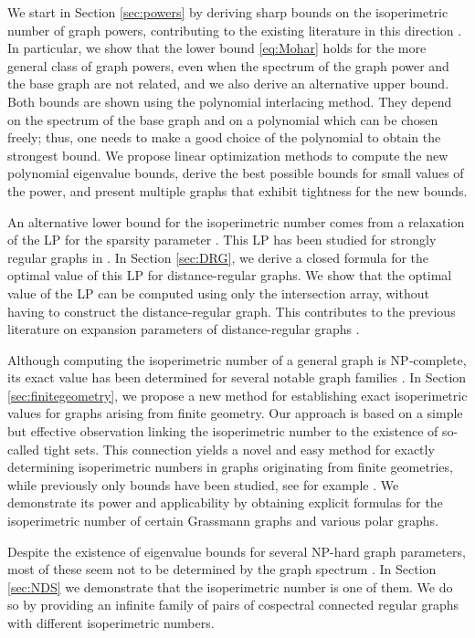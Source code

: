 \documentclass[a4paper,11pt]{article}
\theoremstyle{definition}
\begin{document}
We start in Section \ref{sec:powers} by deriving sharp bounds on the isoperimetric number of graph powers, contributing to the existing literature in this direction  \cite{cartesianpowersregulargrpahs,hypercubeedgeisopowers,V2026}. In particular, we show that the lower bound \eqref{eq:Mohar} holds for the more general class of graph  powers, even when the spectrum of the graph power and the base graph are not related, and we also derive an alternative upper bound. Both bounds are shown using the polynomial interlacing method. They depend on the spectrum of the base graph and on a polynomial which can be chosen freely; thus, one needs to make a good choice of the polynomial to obtain the strongest bound. We propose linear optimization methods to compute the new polynomial eigenvalue bounds, derive the best possible bounds for small values of the power, and present multiple graphs that exhibit tightness for the new bounds.

An alternative lower bound for the isoperimetric number comes from a relaxation of the LP for the sparsity parameter \cite{LLR1995}. This LP has been studied for strongly regular graphs in \cite{S2005}. In Section \ref{sec:DRG}, we derive a closed formula for the optimal value of this LP for distance-regular graphs. We show that the optimal value of the LP can be computed using only the intersection array, without having to construct the distance-regular graph. This contributes to the previous literature on expansion parameters of distance-regular graphs  \cite{KL2013,QKM2020,S2005}. 

Although computing the isoperimetric number of a general graph is NP‑complete, its exact value has been determined for several notable graph families \cite{Aslan2013,M1989}. 
In Section \ref{sec:finitegeometry}, we propose a new method for establishing exact isoperimetric values for graphs arising from finite geometry. Our approach is based on a simple but effective observation linking the isoperimetric number to the existence of so-called tight sets. This connection yields a novel and easy method for exactly determining isoperimetric numbers in graphs originating from finite geometries, while previously only bounds have been studied, see for example \cite{levi}. We demonstrate its power and applicability by obtaining explicit formulas for the isoperimetric number of certain Grassmann graphs and various polar graphs.

Despite the existence of eigenvalue bounds for several NP-hard graph parameters, most of these seem not to be determined by the graph spectrum \cite{MRC,bch2015,h2020,h1996,lwyl2010}. In Section \ref{sec:NDS} we demonstrate that the isoperimetric number is one of them. We do so by providing an infinite family of pairs of cospectral connected regular graphs with different isoperimetric numbers. 
\end{document}
